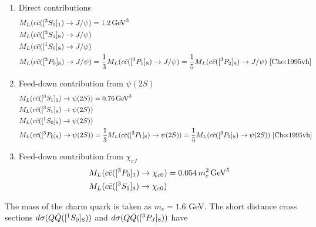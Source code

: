 \documentclass[aps,prc,preprint,superscriptaddress,showpacs,showkeys,amsmath]{revtex4-1}
\begin{document}
\begin{enumerate}
\item{Direct contributions
\begin{equation}
\begin{split}
&M_{L}(c{\bar{c}}([^3S_1]_{1})\rightarrow J/\psi) = 1.2\,{\rm GeV}^{3}\\
&M_{L}(c{\bar{c}}([^3S_1]_{8})\rightarrow J/\psi) \\
&M_{L}(c{\bar{c}}([^1S_0]_{8})\rightarrow J/\psi) \\
&M_{L}(c{\bar{c}}([^3P_0]_{8})\rightarrow J/\psi) = \frac{1}{3} M_{L}(c{\bar{c}}([^3P_1]_{8})\rightarrow J/\psi) 
  =\frac{1}{5} M_{L}(c{\bar{c}}([^3P_2]_{8})\rightarrow J/\psi)~\cite{Cho:1995vh}
~\label{eq:Mpsi1}
\end{split}
\end{equation}
    }
\item{Feed-down contribution from $\psi(2S)$
\begin{equation}
\begin{split}
&M_{L}(c{\bar{c}}([^3S_1]_{1})\rightarrow \psi(2S)) = 0.76\,{\rm GeV}^{3}\\
&M_{L}(c{\bar{c}}([^3S_1]_{8})\rightarrow \psi(2S)) \\
&M_{L}(c{\bar{c}}([^1S_0]_{8})\rightarrow \psi(2S)) \\
&M_{L}(c{\bar{c}}([^3P_0]_{8})\rightarrow \psi(2S)) =\frac{1}{3} M_{L}(c{\bar{c}}([^3P_1]_{8})\rightarrow \psi(2S))
  =\frac{1}{5} M_{L}(c{\bar{c}}([^3P_2]_{8})\rightarrow \psi(2S))~\cite{Cho:1995vh}
~\label{eq:Mpsi2}
\end{split}
\end{equation}
  }
\item{Feed-down contribution from $\chi_{cJ}$
\begin{equation}
\begin{split}
&M_{L}(c{\bar{c}}([^3P_0]_{1})\rightarrow \chi_{c0}) = 0.054\,m_{c}^{2}\,{\rm GeV}^{5}\\ 
&M_{L}(c{\bar{c}}([^3S_1]_{8})\rightarrow \chi_{c0})
~\label{eq:Mchi}
\end{split}
\end{equation}
    }
\end{enumerate}
The mass of the charm quark is taken as $m_{c}=1.6$ GeV. The short distance cross 
sections $d\sigma(Q{\bar{Q}}([^1S_0]_{8}))$ and $d\sigma(Q{\bar{Q}}([^3P_J]_{8}))$ have
\end{document}
